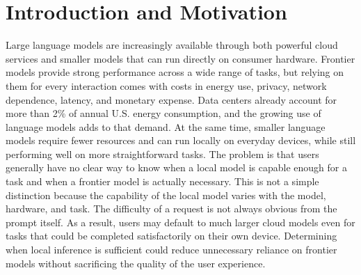 \documentclass[sigconf,nonacm]{acmart}
\begin{document}
\section{Introduction and Motivation}
Large language models are increasingly available through both powerful cloud services and smaller models that can run directly on consumer hardware. Frontier models provide strong performance across a wide range of tasks, but relying on them for every interaction comes with costs in energy use, privacy, network dependence, latency, and monetary expense. Data centers already account for more than 2\% of annual U.S. energy consumption, and the growing use of language models adds to that demand. At the same time, smaller language models require fewer resources and can run locally on everyday devices, while still performing well on more straightforward tasks. The problem is that users generally have no clear way to know when a local model is capable enough for a task and when a frontier model is actually necessary. This is not a simple distinction because the capability of the local model varies with the model, hardware, and task. The difficulty of a request is not always obvious from the prompt itself. As a result, users may default to much larger cloud models even for tasks that could be completed satisfactorily on their own device. Determining when local inference is sufficient could reduce unnecessary reliance on frontier models without sacrificing the quality of the user experience.  
\end{document}
